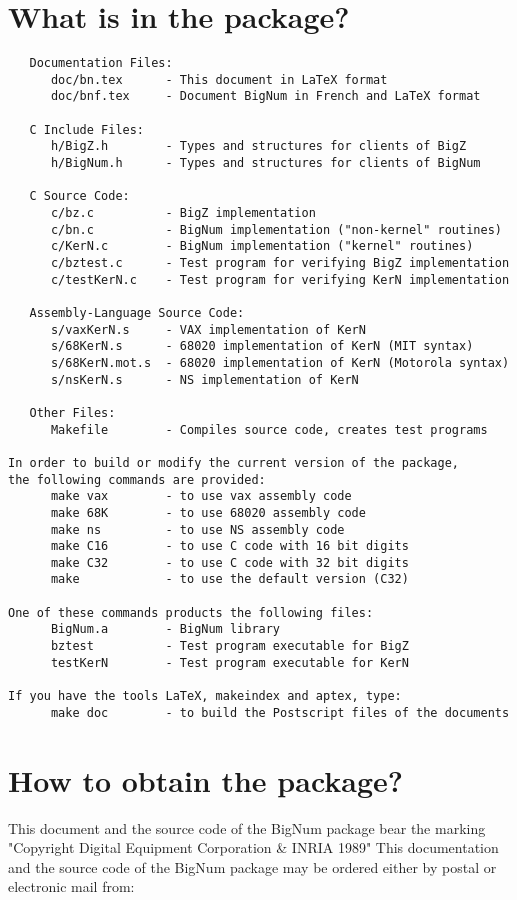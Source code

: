 \section{What is in the package?}
\begin{verbatim}
   Documentation Files:
      doc/bn.tex      - This document in LaTeX format
      doc/bnf.tex     - Document BigNum in French and LaTeX format

   C Include Files:
      h/BigZ.h        - Types and structures for clients of BigZ
      h/BigNum.h      - Types and structures for clients of BigNum

   C Source Code:
      c/bz.c          - BigZ implementation
      c/bn.c          - BigNum implementation ("non-kernel" routines)
      c/KerN.c        - BigNum implementation ("kernel" routines)
      c/bztest.c      - Test program for verifying BigZ implementation
      c/testKerN.c    - Test program for verifying KerN implementation

   Assembly-Language Source Code:
      s/vaxKerN.s     - VAX implementation of KerN
      s/68KerN.s      - 68020 implementation of KerN (MIT syntax)
      s/68KerN.mot.s  - 68020 implementation of KerN (Motorola syntax)
      s/nsKerN.s      - NS implementation of KerN

   Other Files:
      Makefile        - Compiles source code, creates test programs

In order to build or modify the current version of the package, 
the following commands are provided:
      make vax        - to use vax assembly code
      make 68K        - to use 68020 assembly code
      make ns         - to use NS assembly code
      make C16        - to use C code with 16 bit digits
      make C32        - to use C code with 32 bit digits 
      make            - to use the default version (C32)

One of these commands products the following files:
      BigNum.a        - BigNum library
      bztest          - Test program executable for BigZ
      testKerN        - Test program executable for KerN

If you have the tools LaTeX, makeindex and aptex, type:
      make doc        - to build the Postscript files of the documents
\end{verbatim}

\clearpage
\section{How to obtain the package?}
\label{HowToObtain}
This document and the source code of the BigNum package bear the
marking "Copyright Digital Equipment Corporation \& INRIA 1989"
This documentation and the source code of the BigNum package may
be ordered either by postal or electronic mail from:\\

